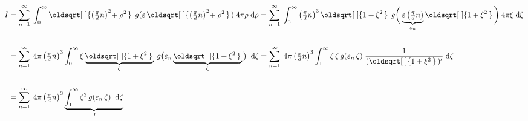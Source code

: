 \documentclass[10pt,a4paper]{article}
\renewcommand*{\sqrt}[2][\ ]{\oldsqrt[#1]{#2\,}\,}
\newcommand{\const}[1]{\text{#1}}
\renewcommand{\d}[1]{\;\const{d}#1}
\begin{document}
\begin{align*}
    I &=
    \sum_{n = 1}^\infty \;
    \int_0^\infty
    \sqrt{
        \left( \tfrac{\pi}{d} n \right)^2
        \! + \rho^2
    } \;
    g(\varepsilon \, \sqrt{\left( \tfrac{\pi}{d} n \right)^2
        \! + \rho^2
    }) \;
    4\pi \rho \d{\rho}
    =
    \sum_{n = 1}^\infty \;
    \int_0^\infty
    \left( \tfrac{\pi}{d} n \right)^3
    \sqrt{
        1 + \xi^2
    } \;
    g\bigg(
        \underbrace{
            \varepsilon \, \big( \tfrac{\pi}{d} n \big)
        }_{\varepsilon_n}
        \sqrt{1 + \xi^2}
    \bigg) \;
    4\pi \xi \d{\xi}
    \\\\
    &=
    \sum_{n = 1}^\infty \;
    4\pi
    \left( \tfrac{\pi}{d} n \right)^3
    \int_0^\infty
    \xi
    \underbrace{ \sqrt{ 1 + \xi^2} }_{\zeta} \;
    g\big(
        \varepsilon_n
        \underbrace{ \sqrt{ 1 + \xi^2} }_{\zeta}
    \big) \;
    \d{\xi}
    =
    \sum_{n = 1}^\infty \;
    4\pi
    \left( \tfrac{\pi}{d} n \right)^3
    \int_1^\infty
    \xi \, \zeta \,
    g( \varepsilon_n \, \zeta ) \;
    \frac{1}{(\sqrt{1 + \xi^2})'}
    \d{\zeta}
    \\\\
    &=
    \sum_{n=1}^\infty \;
    4\pi
    \left( \tfrac{\pi}{d} n \right)^3
    \underbrace{
        \int_1^\infty
        \zeta^2 \,
        g( \varepsilon_n \, \zeta ) \;
        \d{\zeta}
    }_{J}
\end{align*}
\end{document}
